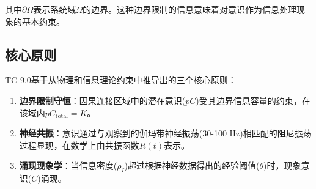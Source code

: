 \documentclass[12pt]{article}
\begin{document}
其中$\partial \Omega$表示系统域$\Omega$的边界。这种边界限制的信息意味着对意识作为信息处理现象的基本约束。

\subsection{核心原则}
TC 9.0基于从物理和信息理论约束中推导出的三个核心原则：

\begin{enumerate}
    \item \textbf{边界限制守恒}：因果连接区域中的潜在意识($pC$)受其边界信息容量的约束，在该域内$pC_{\text{total}} = K$。
    
    \item \textbf{神经共振}：意识通过与观察到的伽玛带神经振荡(30-100 Hz)相匹配的阻尼振荡过程显现，在数学上由共振函数$R(t)$表示。
    
    \item \textbf{涌现现象学}：当信息密度($\rho_I$)超过根据神经数据得出的经验阈值($\theta$)时，现象意识($C$)涌现。
\end{enumerate}
\end{document}
